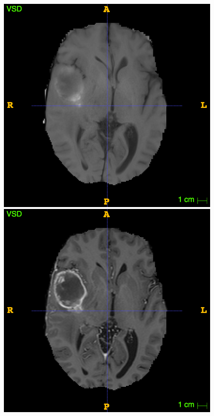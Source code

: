 \documentclass[12pt,a4paper,twoside,openright]{report}
\begin{document}
\begin{figure}
	\centering
	\includegraphics[scale=0.15]{T1_example}
	\includegraphics[scale=0.15]{T1c_example}

\end{figure}
\end{document}

